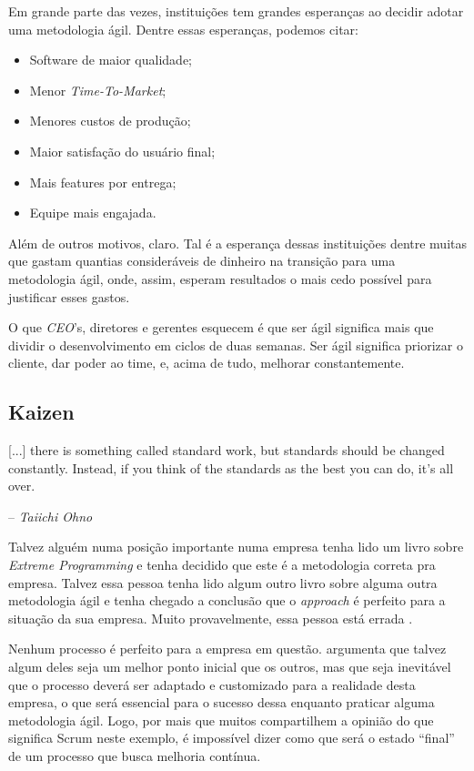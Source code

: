\documentclass{iiufrgs}
\begin{document}
Em grande parte das vezes, instituições tem grandes esperanças ao decidir adotar uma metodologia ágil. Dentre essas esperanças, podemos citar:

\begin{itemize}[leftmargin=3em, noitemsep, nosep, before=\vspace{1cm}, after=\vspace{1cm}]
    \setlength{\itemindent}{1em}
    \item Software de maior qualidade;
    \item Menor \textit{Time-To-Market};
    \item Menores custos de produção; 
    \item Maior satisfação do usuário final; 
    \item Mais features por entrega;
    \item Equipe mais engajada.
\end{itemize}

Além de outros motivos, claro. Tal é a esperança dessas instituições dentre muitas que gastam quantias consideráveis de dinheiro na transição para uma metodologia ágil, onde, assim, esperam resultados o mais cedo possível para justificar esses gastos.

O que \textit{CEO}'s, diretores e gerentes esquecem é que ser ágil significa mais que dividir o desenvolvimento em ciclos de duas semanas. Ser ágil significa priorizar o cliente, dar poder ao time, e, acima de tudo, melhorar constantemente.

\subsection{Kaizen}\label{kaizen}

\epigraph{[...] there is something called standard work, but standards should be changed constantly. Instead, if you think of the standards as the best you can do, it's all over.}{-- \textit{Taiichi Ohno}}

Talvez alguém numa posição importante numa empresa tenha lido um livro sobre \textit{Extreme Programming} e tenha decidido que este é a metodologia correta pra empresa. Talvez essa pessoa tenha lido algum outro livro sobre alguma outra metodologia ágil e tenha chegado a conclusão que o \textit{approach} é perfeito para a situação da sua empresa. Muito provavelmente, essa pessoa está errada \cite{Cohn2009Succeeding}.

Nenhum processo é perfeito para a empresa em questão. \citeauthor{Cohn2009Succeeding} argumenta que talvez algum deles seja um melhor ponto inicial que os outros, mas que seja inevitável que o processo deverá ser adaptado e customizado para a realidade desta empresa, o que será essencial para o sucesso dessa enquanto praticar alguma metodologia ágil. Logo, por mais que muitos compartilhem a opinião do que significa Scrum neste exemplo, é impossível dizer como que será o estado \enquote{final} de um processo que busca melhoria contínua.
\end{document}
